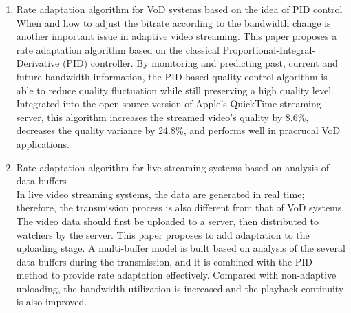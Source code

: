 \begin{eabstract}
\begin{enumerate}
\item {Rate adaptation algorithm for VoD systems based on the idea of PID control}\\
When and how to adjust the bitrate according to the bandwidth change is another important issue in adaptive video streaming. This paper proposes a rate adaptation algorithm based on the classical Proportional-Integral-Derivative (PID) controller. By monitoring and predicting past, current and future bandwidth information, the PID-based quality control algorithm is able to reduce quality fluctuation while still preserving a high quality level. Integrated into the open source version of Apple's QuickTime streaming server, this algorithm increases the streamed video's quality by 8.6\%, decreases the quality variance by 24.8\%, and performs well in pracrucal VoD applications.
\item {Rate adaptation algorithm for live streaming systems based on analysis of data buffers}\\
In live video streaming systems, the data are generated in real time; therefore, the transmission process is also different from that of VoD systems. The video data should first be uploaded to a server, then distributed to watchers by the server. This paper proposes to add adaptation to the uploading stage. A multi-buffer model is built based on analysis of the several data buffers during the transmission, and it is combined with the PID method to provide rate adaptation effectively. Compared with non-adaptive uploading, the bandwidth utilization is increased and the playback continuity is also improved.
\end{enumerate}
\end{eabstract}